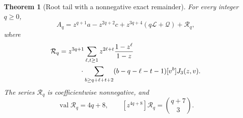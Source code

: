 \documentclass[11pt,letterpaper]{article}
\newtheorem{theorem}{Theorem}[section]
\theoremstyle{definition}\newtheorem{definition}[theorem]{Definition}
\theoremstyle{remark}\newtheorem{remark}[theorem]{Remark}
\newcommand{\val}{\operatorname{val}}
\newcommand{\Lcal}{\mathcal L}
\newcommand{\Qcal}{\mathcal Q}
\newcommand{\Rcal}{\mathcal R}
\begin{document}
\begin{theorem}[Root tail with a nonnegative exact remainder]\label{hod:three:thm:roottail}
For every integer $q\ge0$,
\begin{equation}\label{hod:three:eq:roottail}
A_q=z^{q+1}a-z^{2q+2}c+z^{3q+4}(q\Lcal+\Qcal)+\Rcal_q,
\end{equation}
where
\begin{equation}\label{hod:three:eq:rootremainder}
\begin{split}
\Rcal_q={}&z^{3q+1}\sum_{\ell,t\ge1}z^{2\ell+t}\frac{1-z^\ell}{1-z}\\
&\hspace{6mm}\cdot\sum_{b\ge q+\ell+t+2}(b-q-\ell-t-1)[v^b]J_3(z,v).
\end{split}
\end{equation}
The series $\Rcal_q$ is coefficientwise nonnegative, and
\begin{equation}\label{hod:three:eq:rootfirsterror}
\val\Rcal_q=4q+8,\qquad [z^{4q+8}]\Rcal_q=\binom{q+7}{3}.
\end{equation}
\end{theorem}
\end{document}
